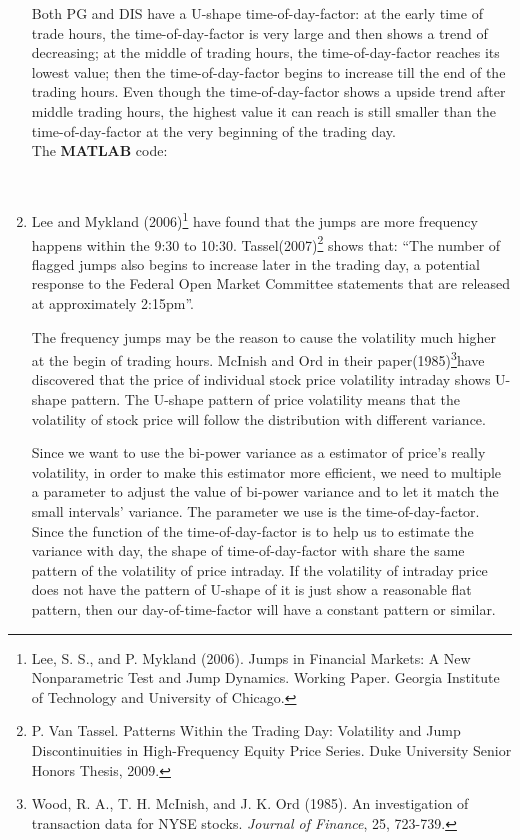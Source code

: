 \documentclass[12pt,letterpaper]{article}
\begin{document}
\begin{enumerate}[label=\textbf{(\Alph*)}]
Both PG and DIS have a U-shape time-of-day-factor: at the early time of trade hours, the time-of-day-factor is very large and then shows a trend of decreasing; at the middle of trading hours, the time-of-day-factor reaches its lowest value; then the time-of-day-factor begins to increase till the end of the trading hours. Even though the time-of-day-factor shows a upside trend after middle trading hours, the highest value it can reach is still smaller than the time-of-day-factor at the very beginning of the trading day.  \\

   The \textbf{MATLAB} code:
   
   ~~\\

\item Lee and Mykland (2006)\footnote{Lee, S. S., and P. Mykland (2006). Jumps in Financial Markets: A New Nonparametric Test and Jump Dynamics. Working Paper. Georgia Institute of Technology and University of Chicago.} have found that the jumps are more frequency happens within the 9:30 to 10:30. Tassel(2007)\footnote{P. Van Tassel. Patterns Within the Trading Day: Volatility and Jump Discontinuities
in High-Frequency Equity Price Series. Duke University Senior Honors Thesis, 2009.} shows that: ``The number of flagged jumps also begins to increase later in the trading day, a potential response to the Federal Open Market Committee statements that are released at approximately 2:15pm''. 

The frequency jumps may be the reason to cause the volatility much higher at the begin of trading hours. McInish and Ord in their paper(1985)\footnote{Wood, R. A., T. H. McInish, and J. K. Ord (1985). An investigation of transaction data for NYSE stocks. \emph{Journal of Finance}, 25, 723-739.}have discovered that the price of individual stock price volatility intraday shows U-shape pattern. The U-shape pattern of price volatility means that the volatility of stock price will follow the distribution with different variance. 

Since we want to use the bi-power variance as a estimator of price's really volatility, in order to make this estimator more efficient, we need to multiple a parameter to adjust the value of bi-power variance and to let it match the small intervals' variance. The parameter we use is the time-of-day-factor. Since the function of the time-of-day-factor is to help us to estimate the variance with day, the shape of time-of-day-factor with share the same pattern of the volatility of price intraday. If the volatility of intraday price does not have the pattern of U-shape of it is just show a reasonable flat pattern, then our day-of-time-factor will have a constant pattern or similar. \\


\end{enumerate}
\end{document}
